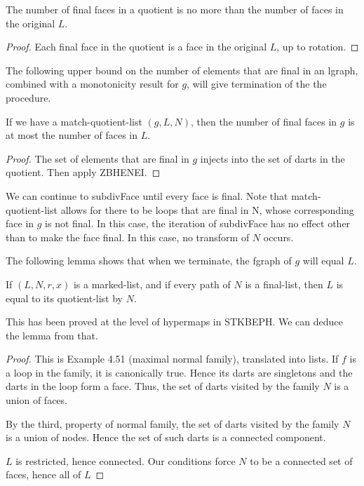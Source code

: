 \begin{lemma}  The number of final faces in a quotient is no more than
the number of faces in the original $L$.
\end{lemma}

\begin{proof} 
Each final face in the quotient is a face in the original $L$, up to rotation.
\end{proof}

The following upper bound on the number of elements that are final in 
an lgraph, combined with a monotonicity result for $g$, will give termination
of the the procedure.

\begin{lemma} If we have a match-quotient-list $(g,L,N)$,
then the number of final faces  in $g$ is at most the number of faces in $L$.
\end{lemma}

\begin{proof}  The set of elements that are final in $g$ injects into the
set of darts in the quotient.  Then apply ZBHENEI.
\end{proof}

We can continue to subdivFace until every face is final.  Note that match-quotient-list
allows for there to be loops that are final in N, whose corresponding face in $g$ is not final.
In this case, the iteration of subdivFace has no effect other than to make the face final.
In this case,  no transform of $N$ occurs.

The following lemma shows that when we terminate, the fgraph of $g$
will equal $L$.

\begin{lemma} If $(L,N,r,x)$ is a marked-list, 
and if every path of $N$
is a final-list, then $L$ is equal to its quotient-list by $N$.
\end{lemma}

This has been proved at the level of hypermaps in STKBEPH.  We can deduce
the lemma from that.

\begin{proof} This is Example 4.51 (maximal normal family), translated into lists.
If $f$ is a loop in the family, it is canonically true.  Hence its
darts are singletons and the darts in the loop form a face.  Thus,
the set of darts visited by the family $N$ is a union of faces.

By the third, property of normal family, the set of darts visited by
the family $N$ is a union of nodes.  Hence the set of such darts is
a connected component. 

$L$ is restricted, hence connected.  
Our conditions force $N$ to be a connected set of faces, hence all of $L$
\end{proof}

